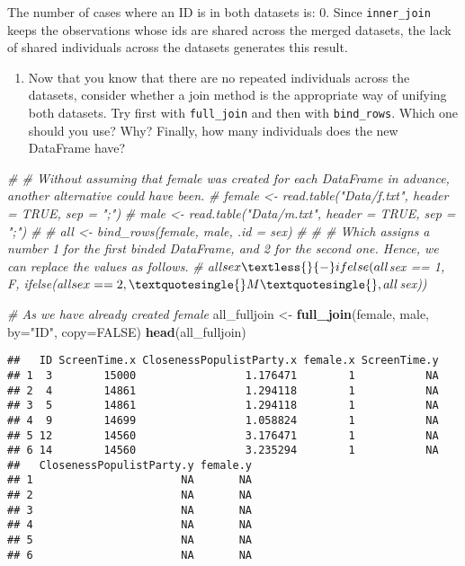 \documentclass[
]{book}
\newenvironment{Shaded}{\begin{snugshade}}{\end{snugshade}}
\newcommand{\AttributeTok}[1]{\textcolor[rgb]{0.13,0.29,0.53}{#1}}
\newcommand{\CommentTok}[1]{\textcolor[rgb]{0.56,0.35,0.01}{\textit{#1}}}
\newcommand{\ConstantTok}[1]{\textcolor[rgb]{0.56,0.35,0.01}{#1}}
\newcommand{\FunctionTok}[1]{\textcolor[rgb]{0.13,0.29,0.53}{\textbf{#1}}}
\newcommand{\NormalTok}[1]{#1}
\newcommand{\OtherTok}[1]{\textcolor[rgb]{0.56,0.35,0.01}{#1}}
\newcommand{\StringTok}[1]{\textcolor[rgb]{0.31,0.60,0.02}{#1}}
\providecommand{\tightlist}{%
  \setlength{\itemsep}{0pt}\setlength{\parskip}{0pt}}
\begin{document}
The number of cases where an ID is in both datasets is: 0. Since \texttt{inner\_join} keeps the observations whose ids are shared across the merged datasets, the lack of shared individuals across the datasets generates this result.

\begin{enumerate}
\def\labelenumi{\arabic{enumi}.}
\setcounter{enumi}{2}
\tightlist
\item
  Now that you know that there are no repeated individuals across the datasets, consider whether a join method is the appropriate way of unifying both datasets. Try first with \texttt{full\_join} and then with \texttt{bind\_rows}. Which one should you use? Why? Finally, how many individuals does the new DataFrame have?
\end{enumerate}

\begin{Shaded}
\begin{Highlighting}[]
\CommentTok{\# \# Without assuming that \textasciigrave{}female\textasciigrave{} was created for each DataFrame in advance, another alternative could have been.}
\CommentTok{\# female \textless{}{-} read.table("Data/f.txt", header = TRUE, sep = ";")}
\CommentTok{\# male \textless{}{-} read.table("Data/m.txt", header = TRUE, sep = ";")}
\CommentTok{\# }
\CommentTok{\# all \textless{}{-} bind\_rows(female, male, .id = \textquotesingle{}sex\textquotesingle{})}
\CommentTok{\# }
\CommentTok{\# \# Which assigns a number 1 for the first binded DataFrame, and 2 for the second one. Hence, we can replace the values as follows.}
\CommentTok{\# all$sex \textless{}{-} ifelse(all$sex == 1, \textquotesingle{}F\textquotesingle{}, ifelse(all$sex == 2, \textquotesingle{}M\textquotesingle{}, all$sex))}

\CommentTok{\# As we have already created \textasciigrave{}female\textasciigrave{}}
\NormalTok{all\_fulljoin }\OtherTok{\textless{}{-}} \FunctionTok{full\_join}\NormalTok{(female, male, }\AttributeTok{by=}\StringTok{"ID"}\NormalTok{, }\AttributeTok{copy=}\ConstantTok{FALSE}\NormalTok{)}
\FunctionTok{head}\NormalTok{(all\_fulljoin)}
\end{Highlighting}
\end{Shaded}

\begin{verbatim}
##   ID ScreenTime.x ClosenessPopulistParty.x female.x ScreenTime.y
## 1  3        15000                 1.176471        1           NA
## 2  4        14861                 1.294118        1           NA
## 3  5        14861                 1.294118        1           NA
## 4  9        14699                 1.058824        1           NA
## 5 12        14560                 3.176471        1           NA
## 6 14        14560                 3.235294        1           NA
##   ClosenessPopulistParty.y female.y
## 1                       NA       NA
## 2                       NA       NA
## 3                       NA       NA
## 4                       NA       NA
## 5                       NA       NA
## 6                       NA       NA
\end{verbatim}
\end{document}
